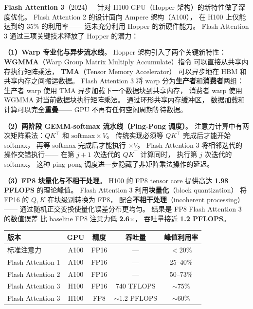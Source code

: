 \textbf{Flash Attention 3}（2024）~\cite{shah2024flashattention3}
针对 H100 GPU（Hopper 架构）的新特性做了深度优化。
Flash Attention 2 的设计面向 Ampere 架构（A100），
在 H100 上仅能达到约 35\% 的利用率——
远未充分利用 Hopper 的新硬件能力。
Flash Attention 3 通过三项关键技术释放了 Hopper 的潜力：

\textbf{（1）Warp 专业化与异步流水线}。
Hopper 架构引入了两个关键新特性：
\textbf{WGMMA}（Warp Group Matrix Multiply Accumulate）指令
可以直接从共享内存执行矩阵乘法，
\textbf{TMA}（Tensor Memory Accelerator）
可以异步地在 HBM 和共享内存之间搬运数据。
Flash Attention 3 将 warp 分为\textbf{生产者}和\textbf{消费者}两组：
生产者 warp 使用 TMA 异步加载下一个数据块到共享内存，
消费者 warp 使用 WGMMA 对当前数据块执行矩阵乘法。
通过环形共享内存缓冲区，
数据加载和计算可以完全\textbf{重叠}——
GPU 不再有任何空闲周期等待数据。

\textbf{（2）两阶段 GEMM-softmax 流水线（Ping-Pong 调度）}。
注意力计算中有两次矩阵乘法：$QK^\top$ 和 $\mathrm{softmax} \times V$。
传统实现必须等 $QK^\top$ 完成后才能开始 softmax，
再等 softmax 完成后才能执行 $\times V$。
Flash Attention 3 将相邻迭代的操作交错执行——
在第 $j+1$ 次迭代的 $QK^\top$ 计算同时，
执行第 $j$ 次迭代的 softmax。
这种 ping-pong 调度进一步隐藏了非矩阵乘法操作的延迟。

\textbf{（3）FP8 块量化与不相干处理}。
H100 的 FP8 tensor core 提供高达 \textbf{1.98 PFLOPS} 的理论峰值。
Flash Attention 3 利用\textbf{块量化}（block quantization）
将 FP16 的 $Q, K$ 在块级别转换为 FP8，
配合\textbf{不相干处理}（incoherent processing）——
通过随机正交变换使量化误差分布更均匀。
结果是 FP8 Flash Attention 3 的数值误差
比 baseline FP8 注意力低 \textbf{2.6$\times$}，
吞吐量接近 \textbf{1.2 PFLOPS}。

\begin{center}
\begin{tabular}{lcccc}
\hline
\textbf{版本} & \textbf{GPU} & \textbf{精度} & \textbf{吞吐量} & \textbf{峰值利用率} \\
\hline
标准注意力 & A100 & FP16 & --- & $<$20\% \\
Flash Attention 1 & A100 & FP16 & --- & 25--40\% \\
Flash Attention 2 & A100 & FP16 & --- & 50--73\% \\
Flash Attention 3 & H100 & FP16 & 740 TFLOPS & $\sim$75\% \\
Flash Attention 3 & H100 & FP8 & $\sim$1.2 PFLOPS & $\sim$60\% \\
\hline
\end{tabular}
\end{center}

